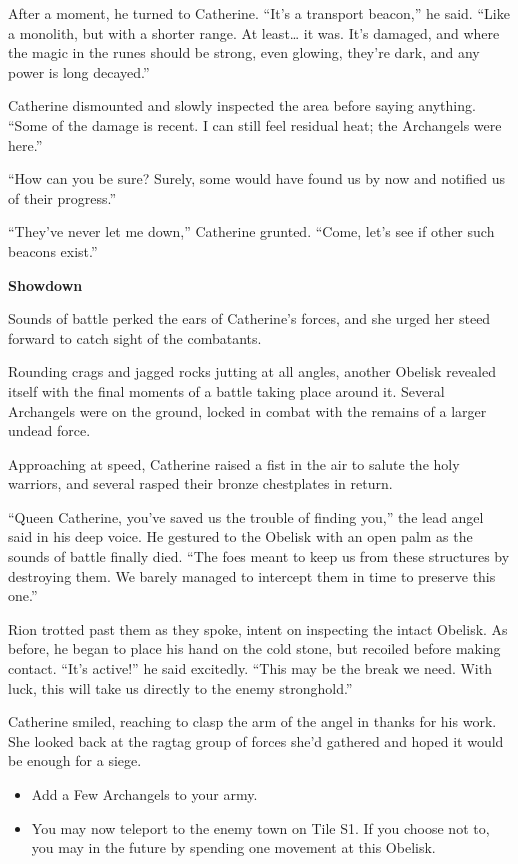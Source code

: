 \begin{multicols*}{2}
After a moment, he turned to Catherine.
``It's a transport beacon,'' he said.
``Like a monolith, but with a shorter range.
At least… it was.
It's damaged, and where the magic in the runes should be strong, even glowing, they're dark, and any power is long decayed.''

Catherine dismounted and slowly inspected the area before saying anything.
``Some of the damage is recent.
I can still feel residual heat; the Archangels were here.''

``How can you be sure? Surely, some would have found us by now and notified us of their progress.''

``They've never let me down,'' Catherine grunted.
``Come, let's see if other such beacons exist.''

\textbf{Showdown}

Sounds of battle perked the ears of Catherine's forces, and she urged her steed forward to catch sight of the combatants.

Rounding crags and jagged rocks jutting at all angles, another Obelisk revealed itself with the final moments of a battle taking place around it.
Several Archangels were on the ground, locked in combat with the remains of a larger undead force.

Approaching at speed, Catherine raised a fist in the air to salute the holy warriors, and several rasped their bronze chestplates in return.

``Queen Catherine, you've saved us the trouble of finding you,'' the lead angel said in his deep voice.
He gestured to the Obelisk with an open palm as the sounds of battle finally died.
``The foes meant to keep us from these structures by destroying them.
We barely managed to intercept them in time to preserve this one.''

Rion trotted past them as they spoke, intent on inspecting the intact Obelisk.
As before, he began to place his hand on the cold stone, but recoiled before making contact.
``It's active!'' he said excitedly.
``This may be the break we need.
With luck, this will take us directly to the enemy stronghold.''

Catherine smiled, reaching to clasp the arm of the angel in thanks for his work.
She looked back at the ragtag group of forces she'd gathered and hoped it would be enough for a siege.

\begin{itemize}
  \item \textcolor{darkcandyapplered}{Add a Few Archangels to your army.}
  \item \textcolor{darkcandyapplered}{You may now teleport to the enemy town on Tile S1.
  If you choose not to, you may in the future by spending one movement at this Obelisk.}
\end{itemize}



\end{multicols*}
